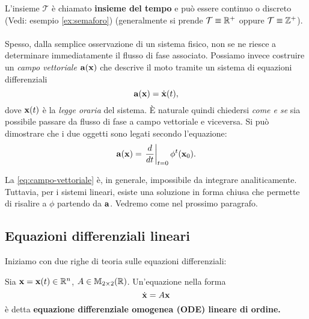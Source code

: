 L'insieme $\mathcal T$ è chiamato \textbf{insieme del tempo} e può essere continuo
o discreto (Vedi: esempio \ref{ex:semaforo}) (generalmente si prende $\mathcal T \equiv \mathbb{R}^+$ oppure $\mathcal T \equiv \mathbb{Z}^+$).

\paragraph{}
Spesso, dalla semplice osservazione di un sistema fisico, non se ne riesce a determinare
immediatamente il flusso di fase associato. Possiamo invece costruire un \emph{campo vettoriale} $\mathbf{a}(\mathbf{x})$
che descrive il moto tramite un sistema di equazioni differenziali
\begin{equation*}
    \mathbf{a}(\mathbf{x}) = \dot {\mathbf{x}} (t),
\end{equation*}
dove $\mathbf{x}(t)$ è la \emph{legge oraria} del sistema.
È naturale quindi chiedersi \emph{come e se} sia possibile passare da flusso di
fase a campo vettoriale e viceversa. Si può dimostrare  che
i due oggetti sono legati secondo l'equazione:
\begin{equation}
    \mathbf{a} (\mathbf{x}) = \left.\frac d {dt} \right| _{t=0} \phi^t (\mathbf{x}_0).
    \label{eq:campo-vettoriale}
\end{equation}

La \eqref{eq:campo-vettoriale} è, in generale, impossibile da integrare analiticamente.
Tuttavia, per i sistemi lineari, esiste una soluzione in forma chiusa che permette di
risalire a $\phi$ partendo da $\mathbf{a}$. Vedremo come nel prossimo paragrafo.



\subsection{Equazioni differenziali lineari}
Iniziamo con due righe di teoria sulle equazioni differenziali:

\begin{definition}
    Sia $\mathbf{x} = \mathbf{x}(t) \in \mathbb{R}^n$, $A \in \mathbb{M}_{2\times 2}(\mathbb{R})$. Un'equazione nella forma
    \begin{equation}
        \dot{\mathbf{x}} = A \mathbf{x}
        \label{eq:sistema-lineare}
    \end{equation}
    è detta \textbf{equazione differenziale omogenea (\textsc{ODE}) lineare di  ordine.}
    \label{def:sistema-lineare}
\end{definition}


